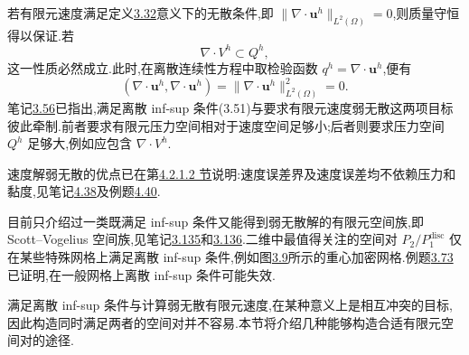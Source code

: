 \begin{note}\label{note:stokes-weakly-divergence-free-infsup-pairs}
若有限元速度满足定义\hyperref[def:weakly-divergence-free]{3.32}意义下的无散条件,即 $\|\nabla\cdot\bm{u}^h\|_{L^2(\Omega)}=0$,则质量守恒得以保证.若
\[
  \nabla\cdot V^h\subset Q^h,
\]
这一性质必然成立.此时,在离散连续性方程中取检验函数 $q^h=\nabla\cdot\bm{u}^h$,便有
\[
  (\nabla\cdot\bm{u}^h,\nabla\cdot\bm{u}^h)
  =\|\nabla\cdot\bm{u}^h\|_{L^2(\Omega)}^2=0.
\]
笔记\hyperref[note:mass-conservation-discrete-spaces]{3.56}已指出,满足离散 inf-sup 条件(3.51)与要求有限元速度弱无散这两项目标彼此牵制.前者要求有限元压力空间相对于速度空间足够小;后者则要求压力空间 $Q^h$ 足够大,例如应包含 $\nabla\cdot V^h$.

速度解弱无散的优点已在第\hyperref[sec:stokes-exactly-divergence-free-pairs]{4.2.1.2 节}说明:速度误差界及速度误差均不依赖压力和黏度,见笔记\hyperref[note:stokes-divergence-free-pair-consequences]{4.38}及例题\hyperref[ex:stokes-scott-vogelius-no-flow]{4.40}.

目前只介绍过一类既满足 inf-sup 条件又能得到弱无散解的有限元空间族,即 Scott--Vogelius 空间族,见笔记\hyperref[note:scott-vogelius-2d]{3.135}和\hyperref[note:scott-vogelius-3d]{3.136}.二维中最值得关注的空间对 $P_2/P_1^{\mathrm{disc}}$ 仅在某些特殊网格上满足离散 inf-sup 条件,例如图\hyperref[fig:barycentric-refinement]{3.9}所示的重心加密网格.例题\hyperref[ex:scott-vogelius-macroelement]{3.73}已证明,在一般网格上离散 inf-sup 条件可能失效.

满足离散 inf-sup 条件与计算弱无散有限元速度,在某种意义上是相互冲突的目标,因此构造同时满足两者的空间对并不容易.本节将介绍几种能够构造合适有限元空间对的途径.
\end{note}

